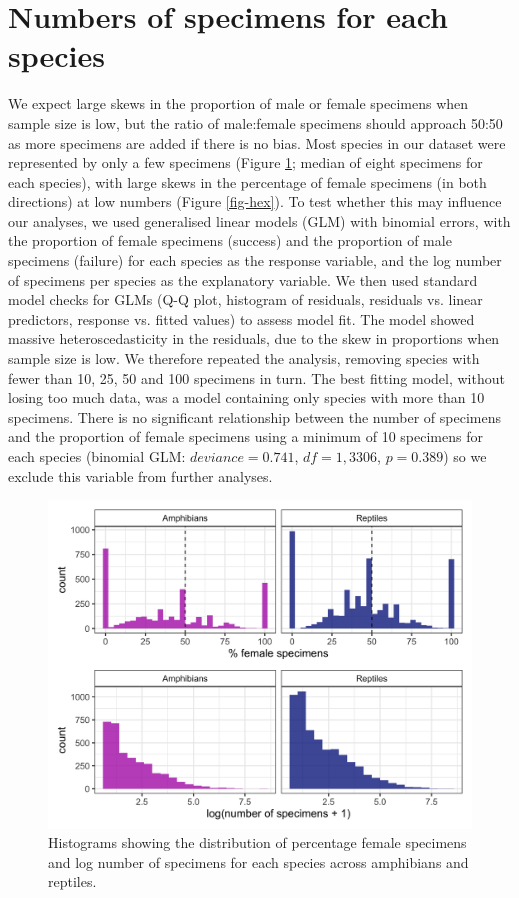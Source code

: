 \documentclass[a4paper, 12pt]{article}
\begin{document}
\newpage
\section{Numbers of specimens for each species}
We expect large skews in the proportion of male or female specimens when sample size is low, but the ratio of male:female specimens should approach 50:50 as more specimens are added if there is no bias. 
Most species in our dataset were represented by only a few specimens (Figure \ref{fig-histograms}; median of eight specimens for each species), with large skews in the percentage of female specimens (in both directions) at low numbers (Figure \ref{fig-hex}).
To test whether this may influence our analyses, we used generalised linear models (GLM) with binomial errors, with the proportion of female specimens (success) and the proportion of male specimens (failure) for each species as the response variable, and the log number of specimens per species as the explanatory variable. 
We then used standard model checks for GLMs (Q-Q plot, histogram of residuals, residuals vs. linear predictors, response vs. fitted values) to assess model fit. 
The model showed massive heteroscedasticity in the residuals, due to the skew in proportions when sample size is low. 
We therefore repeated the analysis, removing species with fewer than 10, 25, 50 and 100 specimens in turn. 
The best fitting model, without losing too much data, was a model containing only species with more than 10 specimens. 
There is no significant relationship between the number of specimens and the proportion of female specimens using a minimum of 10 specimens for each species (binomial GLM: $deviance = 0.741$, $df = 1,3306$, $p = 0.389$) so we exclude this variable from further analyses.

\begin{figure}[H]
 \centering
  \includegraphics[width = \linewidth]{figures/histogram-specimen-counts.png}
  \caption{Histograms showing the distribution of percentage female specimens and log number of specimens for each species across amphibians and reptiles.}
  \label{fig-histograms}
\end{figure}
\end{document}
